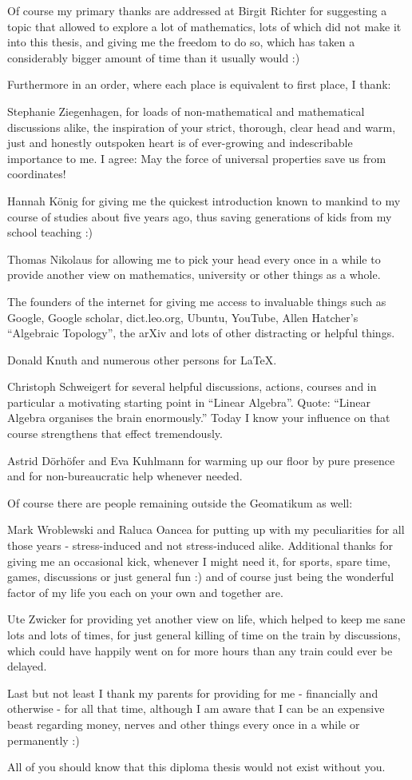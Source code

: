Of course my primary thanks are addressed at Birgit Richter for suggesting a topic that allowed to explore a lot of mathematics, lots of which did
not make it into this thesis, and giving me the freedom to do so, which has taken a considerably bigger amount of time than it usually would :)

Furthermore in an order, where each place is equivalent to first place, I thank:

Stephanie Ziegenhagen, for loads of non-mathematical and mathematical discussions alike, the inspiration of your strict, thorough, clear head and
warm, just and honestly outspoken heart is of ever-growing and indescribable importance to me. I agree: May the force of universal properties save us
from coordinates!

Hannah K\"onig for giving me the quickest introduction known to mankind to my course of studies about five years ago, thus saving generations of kids from my
school teaching :)

Thomas Nikolaus for allowing me to pick your head every once in a while to provide another view on mathematics, university or other things as a whole.

The founders of the internet for giving me access to invaluable things such as Google, Google scholar, dict.leo.org, Ubuntu, YouTube, Allen Hatcher's
``Algebraic Topology'', the arXiv and lots of other distracting or helpful things.

Donald Knuth and numerous other persons for \LaTeX.

Christoph Schweigert for several helpful discussions, actions, courses and in particular a motivating starting point in ``Linear Algebra''. Quote: ``Linear
Algebra organises the brain enormously.'' Today I know your influence on that course strengthens that effect tremendously.

Astrid D\"orh\"ofer and Eva Kuhlmann for warming up our floor by pure presence and for non-bureaucratic help whenever needed.


Of course there are people remaining outside the Geomatikum as well:

Mark Wroblewski and Raluca Oancea for putting up with my peculiarities for all those years - stress-induced and not stress-induced alike. Additional
thanks for giving me an occasional kick, whenever I might need it, for sports, spare time, games, discussions or just general fun :) and of course
just being the wonderful factor of my life you each on your own and together are.

Ute Zwicker for providing yet another view on life, which helped to keep me sane lots and lots of times, for just general killing of time on the train by
discussions, which could have happily went on for more hours than any train could ever be delayed.

Last but not least I thank my parents for providing for me - financially and otherwise - for all that time, although I am aware that I can be an expensive
beast regarding money, nerves and other things every once in a while or permanently :)

All of you should know that this diploma thesis would not exist without you.